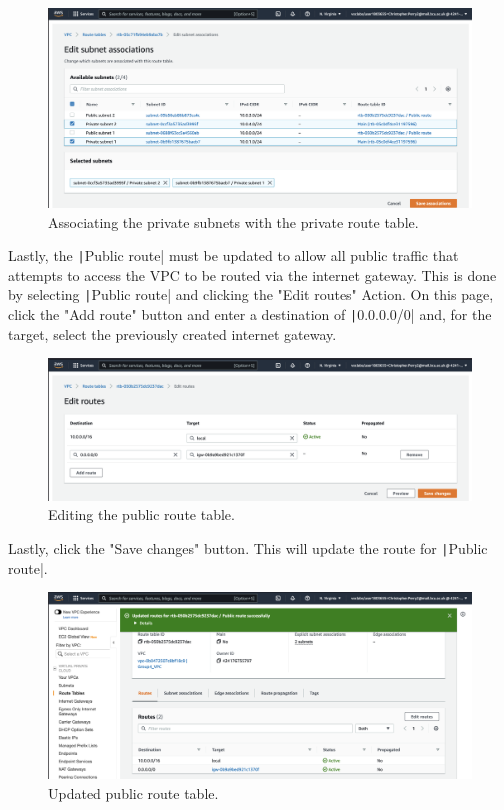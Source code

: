 \begin{figure}[!htbp]
    \centering
    \includegraphics[width=\textwidth]{resources/vpc/routes/vpc-subnet-private-ass}
    \caption{Associating the private subnets with the private route table.}
    \label{fig:vpc-private-ass}
\end{figure}

Lastly, the \texttt|Public route| must be updated to allow all public traffic that attempts to access the VPC
to be routed via the internet gateway.
This is done by selecting \texttt|Public route| and clicking the "Edit routes" Action.
On this page, click the "Add route" button and enter a destination of \texttt|0.0.0.0/0| and, for the target,
select the previously created internet gateway.

\begin{figure}[!htbp]
    \centering
    \includegraphics[width=\textwidth]{resources/vpc/routes/vpc-public-route-table}
    \caption{Editing the public route table.}
    \label{fig:vpc-public-route-table}
\end{figure}

Lastly, click the "Save changes" button.
This will update the route for \texttt|Public route|.

\begin{figure}[!htbp]
    \centering
    \includegraphics[width=\textwidth]{resources/vpc/routes/vpc-public-route-after}
    \caption{Updated public route table.}
    \label{fig:vpc-public-route-after}
\end{figure}
